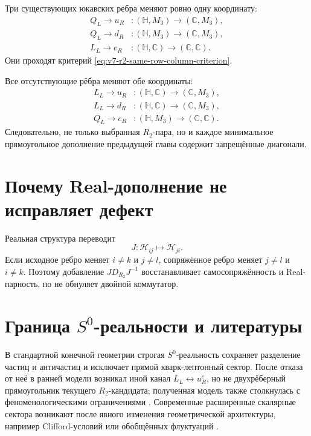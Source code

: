 Три существующих юкавских ребра меняют ровно одну координату:
\begin{align}
 Q_L\to u_R&:(\mathbb H,M_3)\to(\mathbb C,M_3),\nonumber\\
 Q_L\to d_R&:(\mathbb H,M_3)\to(\mathbb C,M_3),\nonumber\\
 L_L\to e_R&:(\mathbb H,\mathbb C)\to(\mathbb C,\mathbb C).
 \label{eq:v7-r2-existing-edge-pass}
\end{align}
Они проходят критерий \eqref{eq:v7-r2-same-row-column-criterion}.

Все отсутствующие рёбра меняют обе координаты:
\begin{align}
 L_L\to u_R&:(\mathbb H,\mathbb C)\to(\mathbb C,M_3),\nonumber\\
 L_L\to d_R&:(\mathbb H,\mathbb C)\to(\mathbb C,M_3),\nonumber\\
 Q_L\to e_R&:(\mathbb H,M_3)\to(\mathbb C,\mathbb C).
 \label{eq:v7-r2-missing-edge-fail}
\end{align}
Следовательно, не только выбранная $R_2$-пара, но и каждое минимальное
прямоугольное дополнение предыдущей главы содержит запрещённые диагонали.

\section{Почему Real-дополнение не исправляет дефект}

Реальная структура переводит
\begin{equation}
 J:\mathcal H_{ij}\longmapsto\mathcal H_{ji}.
 \label{eq:v7-r2-real-coordinate-swap}
\end{equation}
Если исходное ребро меняет $i\ne k$ и $j\ne l$, сопряжённое ребро меняет
$j\ne l$ и $i\ne k$. Поэтому добавление $JD_{R_2}J^{-1}$ восстанавливает
самосопряжённость и Real-парность, но не обнуляет двойной коммутатор.

\section{Граница \texorpdfstring{$S^0$}{S0}-реальности и литературы}

В стандартной конечной геометрии строгая $S^0$-реальность сохраняет
разделение частиц и античастиц и исключает прямой кварк-лептонный сектор.
После отказа от неё в ранней модели возникал иной канал
$L_L\leftrightarrow u_R^c$, но не двухрёберный прямоугольник текущего
$R_2$-кандидата; полученная модель также столкнулась с феноменологическими
ограничениями \cite{v7r2-paschke}. Современные расширенные скалярные сектора
возникают после явного изменения геометрической архитектуры, например
Clifford-условий или обобщённых флуктуаций
\cite{v7r2-kurkov,v7r2-generalized}.


